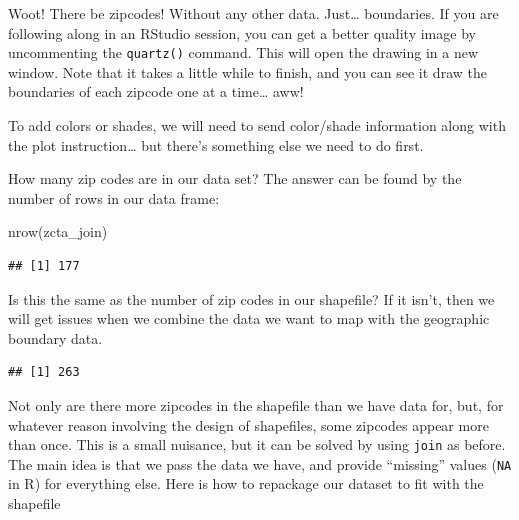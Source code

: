 \documentclass[
  openany]{book}
\newenvironment{Shaded}{\begin{snugshade}}{\end{snugshade}}
\newcommand{\CommentTok}[1]{\textcolor[rgb]{0.56,0.35,0.01}{\textit{#1}}}
\newcommand{\FunctionTok}[1]{\textcolor[rgb]{0.00,0.00,0.00}{#1}}
\newcommand{\NormalTok}[1]{#1}
\newcommand{\OtherTok}[1]{\textcolor[rgb]{0.56,0.35,0.01}{#1}}
\newcommand{\SpecialCharTok}[1]{\textcolor[rgb]{0.00,0.00,0.00}{#1}}
\begin{document}
Woot! There be zipcodes! Without any other data. Just\ldots{} boundaries. If you are following along in an RStudio session, you can get a better quality image by uncommenting the \texttt{quartz()} command. This will open the drawing in a new window. Note that it takes a little while to finish, and you can see it draw the boundaries of each zipcode one at a time\ldots{} aww!

To add colors or shades, we will need to send color/shade information along with the plot instruction\ldots{} but there's something else we need to do first.

How many zip codes are in our data set? The answer can be found by the number of rows in our data frame:

\begin{Shaded}
\begin{Highlighting}[]
\FunctionTok{nrow}\NormalTok{(zcta\_join)}
\end{Highlighting}
\end{Shaded}

\begin{verbatim}
## [1] 177
\end{verbatim}

Is this the same as the number of zip codes in our shapefile? If it isn't, then we will get issues when we combine the data we want to map with the geographic boundary data.

\begin{Shaded}
\end{Shaded}

\begin{verbatim}
## [1] 263
\end{verbatim}

Not only are there more zipcodes in the shapefile than we have data for, but, for whatever reason involving the design of shapefiles, some zipcodes appear more than once. This is a small nuisance, but it can be solved by using \texttt{join} as before. The main idea is that we pass the data we have, and provide ``missing'' values (\texttt{NA} in R) for everything else.
Here is how to repackage our dataset to fit with the shapefile
\end{document}
